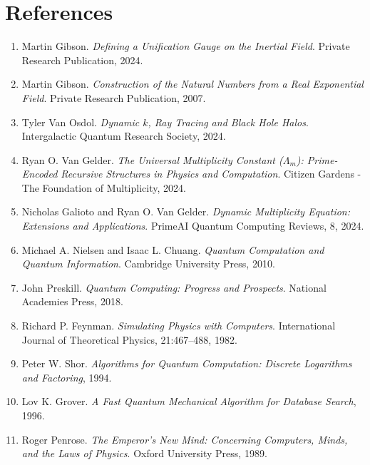 \documentclass[12pt]{article}
\begin{document}
\newpage
\section*{References}
\begin{enumerate}
    \item Martin Gibson. \textit{Defining a Unification Gauge on the Inertial Field}. Private Research Publication, 2024.
    \item Martin Gibson. \textit{Construction of the Natural Numbers from a Real Exponential Field}. Private Research Publication, 2007.
    \item Tyler Van Osdol. \textit{Dynamic $k$, Ray Tracing and Black Hole Halos}. Intergalactic Quantum Research Society, 2024.
    \item Ryan O. Van Gelder. \textit{The Universal Multiplicity Constant ($\Lambda_m$): Prime-Encoded Recursive Structures in Physics and Computation}. Citizen Gardens - The Foundation of Multiplicity, 2024.
    \item Nicholas Galioto and Ryan O. Van Gelder. \textit{Dynamic Multiplicity Equation: Extensions and Applications}. PrimeAI Quantum Computing Reviews, 8, 2024.
    \item Michael A. Nielsen and Isaac L. Chuang. \textit{Quantum Computation and Quantum Information}. Cambridge University Press, 2010.
    \item John Preskill. \textit{Quantum Computing: Progress and Prospects}. National Academies Press, 2018.
    \item Richard P. Feynman. \textit{Simulating Physics with Computers}. International Journal of Theoretical Physics, 21:467--488, 1982.
    \item Peter W. Shor. \textit{Algorithms for Quantum Computation: Discrete Logarithms and Factoring}, 1994.
    \item Lov K. Grover. \textit{A Fast Quantum Mechanical Algorithm for Database Search}, 1996.
    \item Roger Penrose. \textit{The Emperor’s New Mind: Concerning Computers, Minds, and the Laws of Physics}. Oxford University Press, 1989.
\end{enumerate}
\end{document}

